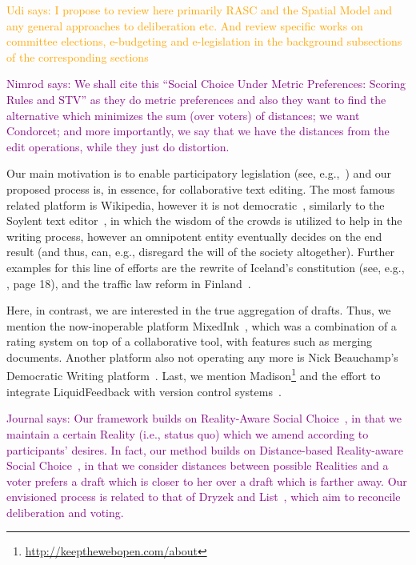 \documentclass[sigconf]{aamas}  %
\newcommand{\journal}[1]{\textcolor{purple}{Journal says: #1}}
\newcommand{\nimrod}[1]{\textcolor{purple}{Nimrod says: #1}}
\newcommand{\udi}[1]{\textcolor{orange}{Udi says: #1}}
\begin{document}
\udi{I propose to review here primarily RASC and the Spatial Model and any general approaches to deliberation etc.
%
 And review specific works on committee elections, e-budgeting and e-legislation in the background subsections of the corresponding sections}

\nimrod{We shall cite this ``Social Choice Under Metric Preferences: Scoring Rules and STV'' as they do metric preferences and also they want to find the alternative which minimizes the sum (over voters) of distances; we want Condorcet; and more importantly, we say that we have the distances from the edit operations, while they just do distortion.}

Our main motivation is to enable participatory legislation (see, e.g.,~\cite{ochoa2008relationship}) and our proposed process is, in essence, for collaborative text editing.
The most famous related platform is Wikipedia, however it is not democratic~\cite{black2008wikipedia},
similarly to the Soylent text editor~\cite{soylent},
in which the wisdom of the crowds is utilized to help in the writing process,
however an omnipotent entity eventually decides on the end result (and thus, can, e.g., disregard the will of the society altogether).
%
Further examples for this line of efforts are the rewrite of Iceland's constitution (see, e.g., \cite{aitamurto2012crowdsourcing}, page 18),
and the traffic law reform in Finland~\cite{govlabone}.

Here, in contrast, we are interested in the true aggregation of drafts.
Thus, we mention the now-inoperable platform MixedInk~\cite{slateone}, which was a combination of a rating system on top of a collaborative tool, with features such as merging documents.
Another platform also not operating any more is Nick Beauchamp's Democratic Writing platform~\cite{nickone}.
Last, we mention Madison\footnote{\url{http://keepthewebopen.com/about}}
and the effort to integrate LiquidFeedback with version control systems~\cite{liquidone}.

\journal{%
Our framework builds on Reality-Aware Social Choice~\cite{realsoc},
in that we maintain a certain Reality (i.e., status quo) which we amend according to participants' desires.
In fact, our method builds on Distance-based Reality-aware Social Choice~\cite{realsoc},
in that we consider distances between possible Realities and a voter prefers a draft which is closer to her over a draft which is farther away.
Our envisioned process is related to that of Dryzek and List~\cite{dryzek2003social}, which aim to reconcile deliberation and voting.
}
\end{document}
